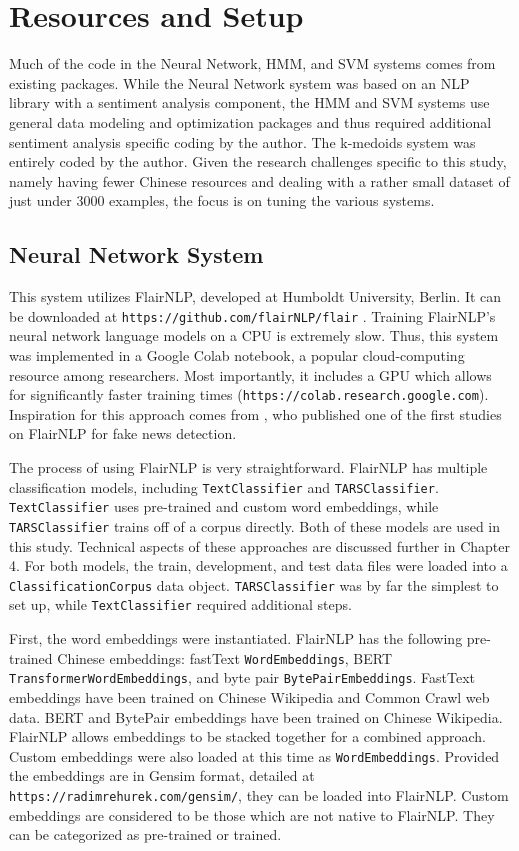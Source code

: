 \documentclass [11pt, proquest] {uwthesis}[2020/02/24]
\begin{document}
\section{Resources and Setup}
Much of the code in the Neural Network, HMM, and SVM systems comes from existing packages. While the Neural Network system was based on an NLP library with a sentiment analysis component, the HMM and SVM systems use general data modeling and optimization packages and thus required additional sentiment analysis specific coding by the author. The k-medoids system was entirely coded by the author. Given the research challenges specific to this study, namely having fewer Chinese resources and dealing with a rather small dataset of just under 3000 examples, the focus is on tuning the various systems.
\subsection{Neural Network System}
This system utilizes FlairNLP, developed at Humboldt University, Berlin. It can be downloaded at \texttt{https://github.com/flairNLP/flair} \citep{Akbik2019}. Training FlairNLP's neural network language models on a CPU is extremely slow. Thus, this system was implemented in a Google Colab notebook, a popular cloud-computing resource among researchers. Most importantly, it includes a GPU which allows for significantly faster training times (\texttt{https://colab.research.google.com}). Inspiration for this approach comes from \cite{Kula2020}, who published one of the first studies on FlairNLP for fake news detection.

The process of using FlairNLP is very straightforward. FlairNLP has multiple classification models, including \texttt{TextClassifier} and \texttt{TARSClassifier}. \texttt{TextClassifier} uses pre-trained and custom word embeddings, while \texttt{TARSClassifier} trains off of a corpus directly. Both of these models are used in this study. Technical aspects of these approaches are discussed further in Chapter 4. For both models, the train, development, and test data files were loaded into a \texttt{ClassificationCorpus} data object. \texttt{TARSClassifier} was by far the simplest to set up, while \texttt{TextClassifier} required additional steps. 

First, the word embeddings were instantiated. FlairNLP has the following pre-trained Chinese embeddings: fastText \texttt{WordEmbeddings}, BERT \texttt{TransformerWordEmbeddings}, and byte pair \texttt{BytePairEmbeddings}. FastText embeddings have been trained on Chinese Wikipedia and Common Crawl web data. BERT and BytePair embeddings have been trained on Chinese Wikipedia. FlairNLP allows embeddings to be stacked together for a combined approach. Custom embeddings were also loaded at this time as \texttt{WordEmbeddings}. Provided the embeddings are in Gensim format, detailed at \texttt{https://radimrehurek.com/gensim/}, they can be loaded into FlairNLP. Custom embeddings are considered to be those which are not native to FlairNLP. They can be categorized as pre-trained or trained.
\end{document}
